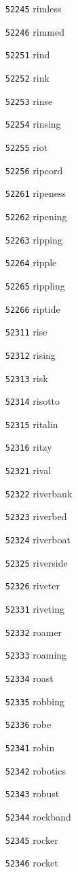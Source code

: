\documentclass[twoside,11pt]{article}
\begin{document}
\begin{multicols}{5}
\begin{enumerate}
\item[\texttt{52245}] rimless
\item[\texttt{52246}] rimmed
\item[\texttt{52251}] rind
\item[\texttt{52252}] rink
\item[\texttt{52253}] rinse
\item[\texttt{52254}] rinsing
\item[\texttt{52255}] riot
\item[\texttt{52256}] ripcord
\item[\texttt{52261}] ripeness
\item[\texttt{52262}] ripening
\item[\texttt{52263}] ripping
\item[\texttt{52264}] ripple
\item[\texttt{52265}] rippling
\item[\texttt{52266}] riptide
\item[\texttt{52311}] rise
\item[\texttt{52312}] rising
\item[\texttt{52313}] risk
\item[\texttt{52314}] risotto
\item[\texttt{52315}] ritalin
\item[\texttt{52316}] ritzy
\item[\texttt{52321}] rival
\item[\texttt{52322}] riverbank
\item[\texttt{52323}] riverbed
\item[\texttt{52324}] riverboat
\item[\texttt{52325}] riverside
\item[\texttt{52326}] riveter
\item[\texttt{52331}] riveting
\item[\texttt{52332}] roamer
\item[\texttt{52333}] roaming
\item[\texttt{52334}] roast
\item[\texttt{52335}] robbing
\item[\texttt{52336}] robe
\item[\texttt{52341}] robin
\item[\texttt{52342}] robotics
\item[\texttt{52343}] robust
\item[\texttt{52344}] rockband
\item[\texttt{52345}] rocker
\item[\texttt{52346}] rocket

\end{enumerate}
\end{multicols}
\end{document}

